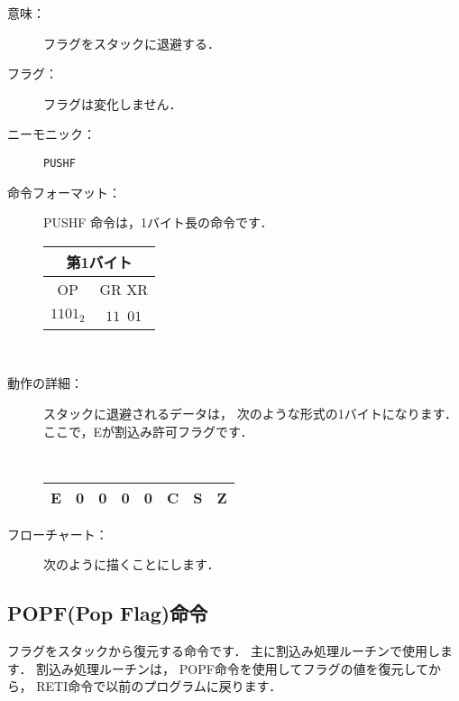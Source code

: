 \begin{description}
\item[意味：]フラグをスタックに退避する．

\item[フラグ：]フラグは変化しません．

\item[ニーモニック：] {\tt PUSHF}

\item[命令フォーマット：]PUSHF 命令は，1バイト長の命令です．

\begin{tabular}{|c|c|} \hline
\multicolumn{2}{|c|}{第1バイト} \\
\hline
OP & GR XR \\
\hline
$1101_2$ & $11$~$01$ \\
\hline
\end{tabular}\\

\item[動作の詳細：]スタックに退避されるデータは，
次のような形式の1バイトになります．
ここで，Eが割込み許可フラグです．\\
{\small\tt
\begin{tabular}{|c|c|c|c|c|c|c|c|} \hline
E & 0 & 0 & 0 & 0 & C & S & Z \\
\hline
\end{tabular}}

\item[フローチャート：]
次のように描くことにします．

\begin{flushleft}
\epsfxsize=3cm
\end{flushleft}

\end{description}


\newpage
\subsection{POPF(Pop Flag)命令}

フラグをスタックから復元する命令です．
主に割込み処理ルーチンで使用します．
割込み処理ルーチンは，
POPF命令を使用してフラグの値を復元してから，
RETI命令で以前のプログラムに戻ります．

